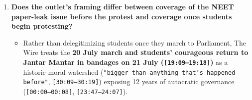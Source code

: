 \documentclass[10pt,a4paper]{article}
\begin{document}
\begin{enumerate}[leftmargin=1.6em, itemsep=4pt, topsep=4pt]
  \begin{itemize}[leftmargin=1.4em, itemsep=2pt, topsep=2pt]
    \item \textbf{Elite proxy advocacy rather than direct student voices:} Because the format is a studio Zoom interview between veteran journalist Karan Thapar and 75-year-old actor Naseeruddin Shah, \textbf{no student speaks directly}; instead, two prominent public intellectuals speak \textit{in solidarity with} (\texttt{"I stand with them"}, \texttt{[20:25]}; \texttt{"We owe it to the children"}, \texttt{[30:19]}) and interpret the youth movement for an English-speaking civic audience.
  \end{itemize}
  \item \textbf{Does the outlet's framing differ between coverage of the NEET paper-leak issue before the protest and coverage once students begin protesting?}
  \begin{itemize}[leftmargin=1.4em, itemsep=2pt, topsep=2pt]
    \item Rather than delegitimizing students once they march to Parliament, The Wire treats the \textbf{20 July march and students' courageous return to Jantar Mantar in bandages on 21 July (\texttt{[19:09--19:18]})} as a historic moral watershed (\texttt{"bigger than anything that's happened before"}, \texttt{[30:09--30:19]}) exposing 12 years of autocratic governance (\texttt{[00:00--00:08]}, \texttt{[23:47--24:07]}).
  \end{itemize}
\end{enumerate}
\end{document}
